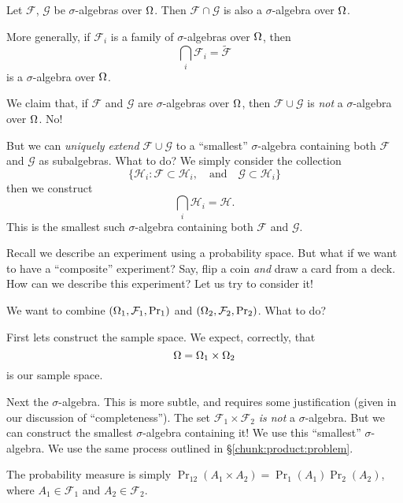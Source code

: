 Let $\mathcal{F}$, $\mathcal{G}$ be $\sigma$-algebras over
$\Omega$. Then $\mathcal{F}\cap\mathcal{G}$ is also a
$\sigma$-algebra over $\Omega$.

More generally, if $\mathcal{F}_{i}$ is a family of $\sigma$-algebras
over $\Omega$, then
\begin{equation}
\bigcap_{i}\mathcal{F}_{i}=\widetilde{\mathcal{F}}
\end{equation}
is a $\sigma$-algebra over $\Omega$.

\label{chunk:product:problem}
We claim that, if $\mathcal{F}$ and $\mathcal{G}$ are $\sigma$-algebras
over $\Omega$, then $\mathcal{F}\cup\mathcal{G}$ is \emph{not} a
$\sigma$-algebra over $\Omega$. No! 

But we can \emph{uniquely extend} $\mathcal{F}\cup\mathcal{G}$ to a
``smallest'' $\sigma$-algebra containing both $\mathcal{F}$ and
$\mathcal{G}$ as subalgebras. What to do? We simply consider the
collection
\begin{equation}
\{\mathcal{H}_{i} : \mathcal{F}\subset\mathcal{H}_{i},\quad\mbox{and}\quad
\mathcal{G}\subset\mathcal{H}_{i}\}
\end{equation}
then we construct
\begin{equation}
\bigcap_{i}\mathcal{H}_{i}=\mathcal{H}.
\end{equation}
This is the smallest such $\sigma$-algebra containing both $\mathcal{F}$
and $\mathcal{G}$.

\M
Recall we describe an experiment using a probability space. But what if
we want to have a ``composite'' experiment? Say, flip a coin \emph{and}
draw a card from a deck. How can we describe this experiment? Let us try
to consider it!

We want to combine $(\Omega_1,\mathcal{F}_1,\mathop{\mathrm{Pr}}\nolimits_1)$ and
$(\Omega_2,\mathcal{F}_2,\mathop{\mathrm{Pr}}\nolimits_2)$. What to do?

First lets construct the sample space. We expect, correctly, that
\begin{equation}
\Omega=\Omega_1\times\Omega_2
\end{equation}
is our sample space. 

Next the $\sigma$-algebra. This is more subtle, and requires some
justification (given in our discussion of ``completeness''). The set
$\mathcal{F}_1\times\mathcal{F}_2$ \emph{is not} a $\sigma$-algebra. But
we can construct the smallest $\sigma$-algebra containing it! We use
this ``smallest'' $\sigma$-algebra. We use the same process outlined in \S\ref{chunk:product:problem}.

The probability measure is simply $\Pr_{12}(A_1\times
A_2)=\Pr_1(A_1)\Pr_2(A_2)$, where $A_1\in\mathcal{F}_1$ and
$A_2\in\mathcal{F}_2$. 
